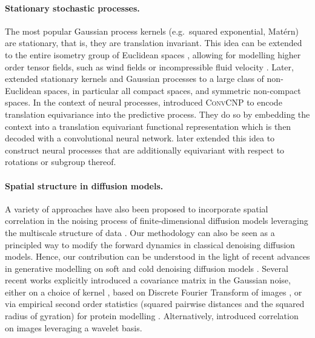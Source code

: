 \paragraph{Stationary stochastic processes.}
The most popular Gaussian process kernels (e.g.\ squared exponential, Mat\'ern) are stationary, that is, they are translation invariant.
This idea can be extended to the entire isometry group of Euclidean spaces \parencite{holderrieth2021equivariant}, allowing for modelling higher order tensor fields, such as wind fields or incompressible fluid velocity \parencite{macedo2010learning}.
Later, \textcite{azangulov2023stationary, azangulov2023stationary2} extended stationary kernels and Gaussian processes to a large class of non-Euclidean spaces, in particular all compact spaces, and symmetric non-compact spaces.
In the context of neural processes, \cite{gordon2019Convolutional} introduced \textsc{ConvCNP} to encode translation equivariance into the predictive process.
They do so by embedding the context into a translation equivariant functional representation which is then decoded with a convolutional neural network.
\textcite{holderrieth2021equivariant} later extended this idea to construct neural processes that are additionally equivariant with respect to rotations or subgroup thereof.

\paragraph{Spatial structure in diffusion models.}
A variety of approaches have also been proposed to incorporate spatial correlation in the noising process of finite-dimensional diffusion models leveraging the multiscale structure of data \parencite{jing2022subspace,guth2022wavelet,ho2022cascaded,saharia2021image,hoogeboom2022blurring,rissanen2022Generative}.
Our methodology can also be seen as a principled way to modify the forward dynamics in classical denoising diffusion models.
Hence, our contribution can be understood in the light of recent advances in generative modelling on soft and cold denoising diffusion models \parencite{daras2022soft,bansal2022cold,hoogeboom2022blurring}.
Several recent works explicitly introduced a covariance matrix in the Gaussian noise, either on a choice of kernel \parencite{bilos2022Modeling}, based on Discrete Fourier Transform of images \parencite{voleti2022Scorebased}, or via empirical second order statistics (squared pairwise distances and the squared radius of gyration) for protein modelling \parencite{ingrahamIlluminating}.
Alternatively, \parencite{guth2022wavelet} introduced correlation on images leveraging a wavelet basis.

